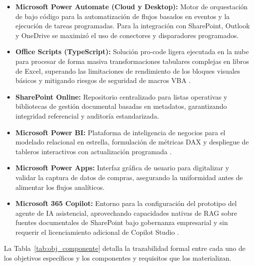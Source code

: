 \begin{itemize}
    \item \textbf{Microsoft Power Automate (Cloud y Desktop):} Motor de orquestación de bajo código para la automatización de flujos basados en eventos y la ejecución de tareas programadas. Para la integración con SharePoint, Outlook y OneDrive se maximizó el uso de conectores y disparadores programados.
    \item \textbf{Office Scripts (TypeScript):} Solución pro-code ligera ejecutada en la nube para procesar de forma masiva transformaciones tabulares complejas en libros de Excel, superando las limitaciones de rendimiento de los bloques visuales básicos y mitigando riesgos de seguridad de macros VBA \cite{microsoft2025officeScriptsIntro}.
    \item \textbf{SharePoint Online:} Repositorio centralizado para listas operativas y bibliotecas de gestión documental basadas en metadatos, garantizando integridad referencial y auditoría estandarizada.
    \item \textbf{Microsoft Power BI:} Plataforma de inteligencia de negocios para el modelado relacional en estrella, formulación de métricas DAX y despliegue de tableros interactivos con actualización programada \cite{sharda2020analytics}.
    \item \textbf{Microsoft Power Apps:} Interfaz gráfica de usuario para digitalizar y validar la captura de datos de compras, asegurando la uniformidad antes de alimentar los flujos analíticos.
    \item \textbf{Microsoft 365 Copilot:} Entorno para la configuración del prototipo del agente de IA asistencial, aprovechando capacidades nativas de RAG sobre fuentes documentales de SharePoint bajo gobernanza empresarial y sin requerir el licenciamiento adicional de Copilot Studio \cite{microsoft2026copilotStudioOverview}.
\end{itemize}

La Tabla~\ref{tab:obj_componente} detalla la trazabilidad formal entre cada uno de los objetivos específicos y los componentes y requisitos que los materializan.

